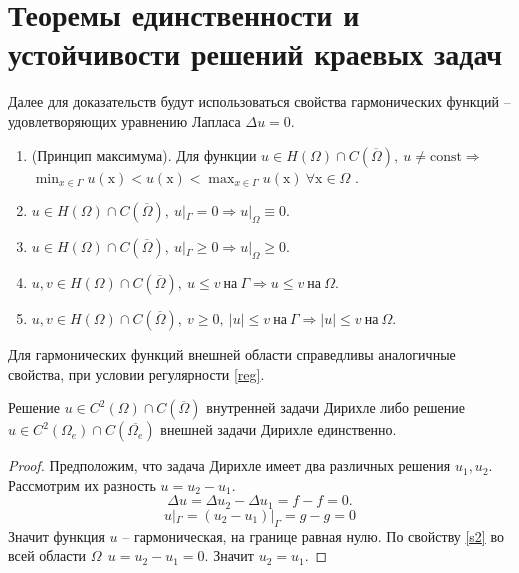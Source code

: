 \section{Теоремы единственности и устойчивости решений краевых задач}

    \begin{remark}
        Далее для доказательств будут использоваться свойства гармонических функций -- удовлетворяющих уравнению Лапласа $ \Delta u = 0 $.
        \begin{enumerate}
            \item (Принцип максимума). Для функции $u \in H(\Omega) \cap C(\overline{\Omega}), ~ u \neq \mathrm{const} \Rightarrow$ \\
            $ \min_{x\in \Gamma} u(\mathrm{x}) < u(\mathrm{x}) < \max_{x\in \Gamma} u(\mathrm{x}) ~ \forall \mathrm{x} \in \Omega $ \label{s1}.
            \item $u \in H(\Omega) \cap C(\overline{\Omega}), ~ u|_\Gamma = 0 \Rightarrow u|_\Omega \equiv 0 \label{s2}$.
            \item $u \in H(\Omega) \cap C(\overline{\Omega}), ~ u|_\Gamma \geq 0 \Rightarrow u|_\Omega \geq 0 \label{s3}$.
            \item $u, v \in H(\Omega) \cap C(\overline{\Omega}), ~ u \leq v ~\text{на}~ \Gamma \Rightarrow u \leq v ~\text{на}~ \Omega \label{s4}$.
            \item $u, v \in H(\Omega) \cap C(\overline{\Omega}), ~ v \geq 0, ~ |u| \leq v ~\text{на}~ \Gamma \Rightarrow |u| \leq v ~\text{на}~ \Omega \label{s5}$.
        \end{enumerate}
        Для гармонических функций внешней области справедливы аналогичные свойства, при условии регулярности \eqref{reg}.
    \end{remark}

    \begin{theorem}
        Решение \(u \in C^2 (\Omega)  \cap C ( \overline{\Omega} )  \) внутренней задачи Дирихле либо решение \(u \in C^2 (\Omega_e)  \cap C ( \overline{\Omega_e} )  \) внешней задачи Дирихле единственно.
    \end{theorem}

    \begin{proof}
        Предположим, что задача Дирихле имеет два различных решения $u_1, u_2$. Рассмотрим их разность $u = u_2 - u_1$.
        \begin{equation}
            \Delta u = \Delta u_2 - \Delta u_1 = f - f = 0. \tag{$j$} \label{lu0}
        \end{equation}
        \begin{equation}
            u|_\Gamma = (u_2 - u_1)|_\Gamma = g - g = 0 \tag{$b$} \label{bvd}
        \end{equation}
        Значит функция $u$ -- гармоническая, на границе равная нулю. По свойству \ref{s2} во всей области $\Omega ~~ u = u_2 - u_1 = 0$. Значит $u_2 = u_1$.
    \end{proof}

